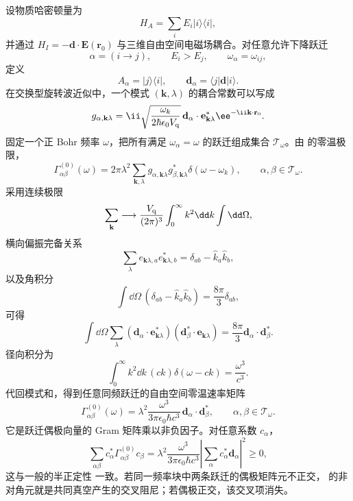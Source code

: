 \begin{exbox}[自由空间多能级电磁场]
设物质哈密顿量为
\[
H_A=\sum_iE_i|i\rangle\langle i|,
\]
并通过 $H_I=-\mathbf d\cdot\mathbf E(\mathbf r_0)$ 与三维自由空间电磁场耦合。对任意允许下降跃迁
\[
\alpha=(i\to j),
\qquad
E_i>E_j,
\qquad
\omega_\alpha=\omega_{ij},
\]
定义
\begin{equation}
A_\alpha=|j\rangle\langle i|,
\qquad
\mathbf d_\alpha
=\langle j|\mathbf d|i\rangle.
\label{eq:phys-oqs-transition-alpha}
\end{equation}
在交换型旋转波近似中，一个模式 $(\mathbf k,\lambda)$ 的耦合常数可以写成
\[
g_{\alpha,\mathbf k\lambda}
=\ii
\sqrt{\frac{\omega_k}{2\hbar\epsilon_0V_{\rm q}}}
\,\mathbf d_\alpha\cdot\mathbf e_{\mathbf k\lambda}^*
\ee^{-\ii\mathbf k\cdot\mathbf r_0}.
\]
固定一个正 Bohr 频率 $\omega$，把所有满足 $\omega_\alpha=\omega$ 的跃迁组成集合 $\mathcal T_\omega$。由 的零温极限，
\[
\Gamma_{\alpha\beta}^{(0)}(\omega)
=2\pi\lambda^2
\sum_{\mathbf k,\lambda}
 g_{\alpha,\mathbf k\lambda}
 g_{\beta,\mathbf k\lambda}^*
\delta(\omega-\omega_k),
\qquad
\alpha,\beta\in\mathcal T_\omega.
\]
采用连续极限
\[
\sum_{\mathbf k}
\longrightarrow
\frac{V_{\rm q}}{(2\pi)^3}
\int_0^\infty k^2\dd k\int\dd\Omega,
\]
横向偏振完备关系
\[
\sum_\lambda e_{\mathbf k\lambda,a}e_{\mathbf k\lambda,b}^*
=\delta_{ab}-\hat k_a\hat k_b,
\]
以及角积分
\[
\int\dd\Omega\,
(\delta_{ab}-\hat k_a\hat k_b)
=\frac{8\pi}{3}\delta_{ab},
\]
可得
\[
\int\dd\Omega\sum_\lambda
(\mathbf d_\alpha\cdot\mathbf e_{\mathbf k\lambda}^*)
(\mathbf d_\beta^*\cdot\mathbf e_{\mathbf k\lambda})
=\frac{8\pi}{3}\mathbf d_\alpha\cdot\mathbf d_\beta^*.
\]
径向积分为
\[
\int_0^\infty k^2\dd k\,(ck)\delta(\omega-ck)
=\frac{\omega^3}{c^3}.
\]
代回模式和，得到任意同频跃迁的自由空间零温速率矩阵
\begin{equation}
\Gamma_{\alpha\beta}^{(0)}(\omega)
=\lambda^2
\frac{\omega^3}{3\pi\epsilon_0\hbar c^3}
\,\mathbf d_\alpha\cdot\mathbf d_\beta^*,
\qquad
\alpha,\beta\in\mathcal T_\omega.
\label{eq:phys-oqs-free-space-gamma-matrix-zerot}
\end{equation}
它是跃迁偶极向量的 Gram 矩阵乘以非负因子。对任意系数 $c_\alpha$，
\[
\sum_{\alpha\beta}c_\alpha^*
\Gamma_{\alpha\beta}^{(0)}c_\beta
=\lambda^2\frac{\omega^3}{3\pi\epsilon_0\hbar c^3}
\left|\sum_\alpha c_\alpha^*\mathbf d_\alpha\right|^2\ge0,
\]
这与一般的半正定性 一致。若同一频率块中两条跃迁的偶极矩阵元不正交， 的非对角元就是共同真空产生的交叉阻尼；若偶极正交，该交叉项消失。


\end{exbox}
